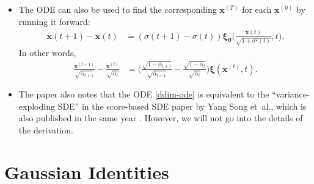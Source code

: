 \documentclass[10pt]{article}
\newcommand{\ve}[1]{\mathbf{#1}}
\newcommand{\ves}[1]{\boldsymbol{#1}}
\newcommand{\etal}{{et~al.}}
\begin{document}
\begin{itemize}
  \item The ODE can also be used to find the corresponding $\ve{x}^{(T)}$ for each $\ve{x}^{(0)}$ by running it forward:
  \begin{align*}
    \overline{\ve{x}}(t+1) - \overline{\ve{x}}(t)
    &= (\sigma(t + 1) - \sigma(t)) \ves{\xi}_{\ves{\theta}}\bigg( \frac{\overline{\ve{x}}(t)}{\sqrt{1 + \sigma^2(t)}}, t \bigg).
  \end{align*}
  In other words,
  \begin{align*}
    \frac{\ve{x}^{(t+1)}}{\sqrt{\overline{\alpha}_{t+1}}} - \frac{\ve{x}^{(t)}}{\sqrt{\overline{\alpha}_t}}
    &= \bigg( \frac{\sqrt{1 - \overline{\alpha}_{t+1}}}{\sqrt{\overline{\alpha}_{t+1}}} - \frac{\sqrt{1 - \overline{\alpha}_t}}{\sqrt{\overline{\alpha}_t}} \bigg)
    \ves{\xi}(\ve{x}^{(t)}, t).
  \end{align*}

  \item The paper also notes that the ODE \eqref{ddim-ode} is equivalent to the ``variance-exploding SDE'' in the score-based SDE paper by Yang Song \etal, which is also published in the same year \cite{Song:2022:sde}. However, we will not go into the details of the derivation.
\end{itemize}

\appendix

\section{Gaussian Identities}
\end{document}

